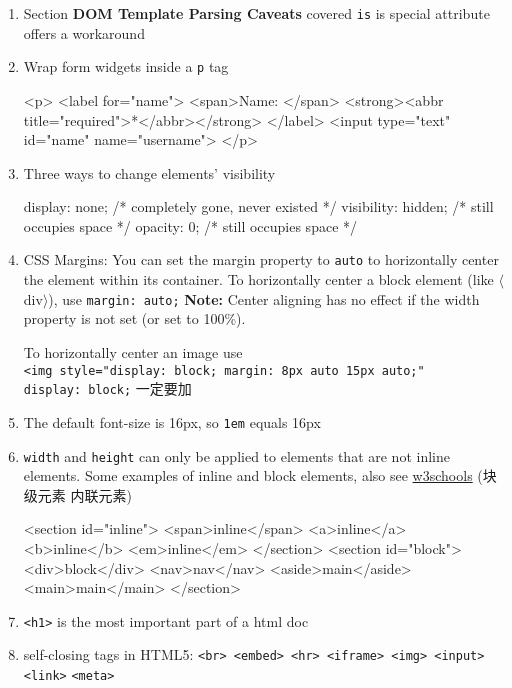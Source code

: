 \documentclass[a4paper,12pt]{article}
\begin{document}
\begin{enumerate}
\item Section \textbf{DOM Template Parsing Caveats} covered \verb|is| is special attribute offers a workaround

\item Wrap form widgets inside a \verb|p| tag
\begin{htmlcode}
<p>
  <label for="name">
    <span>Name: </span>
    <strong><abbr title="required">*</abbr></strong>
  </label>
  <input type="text" id="name" name="username">
</p>
\end{htmlcode}

\item Three ways to change elements' visibility
\begin{htmlcode}
display: none; /* completely gone, never existed */
visibility: hidden; /* still occupies space */
opacity: 0; /* still occupies space */
\end{htmlcode}

\item CSS Margins: You can set the margin property to \verb|auto| to horizontally center the element within its container. To horizontally center a block element (like $\langle$div$\rangle$), use \verb|margin: auto;| \textbf{Note:} Center aligning has no effect if the width property is not set (or set to 100\%).

To horizontally center an image use\\ \verb|<img style="display: block; margin: 8px auto 15px auto;"|\\
\verb|display: block;| 一定要加

\item The default font-size is 16px, so \verb|1em| equals 16px

\item \verb|width| and \verb|height| can only be applied to elements that are not inline elements. Some examples of inline and block elements, also see \href{https://www.w3schools.com/html/html_blocks.asp}{w3schools} (块级元素 内联元素)
\begin{htmlcode}
<section id="inline">
  <span>inline</span>
  <a>inline</a>
  <b>inline</b>
  <em>inline</em>
</section>
<section id="block">
  <div>block</div>
  <nav>nav</nav>
  <aside>main</aside>
  <main>main</main>
</section>
\end{htmlcode}

\item \verb|<h1>| is the most important part of a html doc

\item self-closing tags in HTML5: \verb|<br> <embed> <hr> <iframe> <img> <input> <link>| \verb|<meta>|


\end{enumerate}
\end{document}
